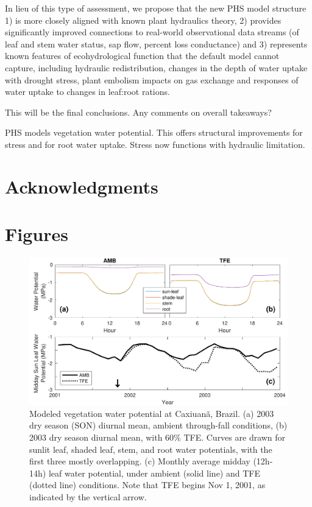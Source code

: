 \documentclass[draft,linenumbers]{agujournal}
\begin{document}
    In lieu of this type of assessment, we propose that the new PHS model structure 1) is more closely aligned with known plant hydraulics theory, 2) provides significantly improved connections to real-world observational data streams (of leaf and stem water status, sap flow, percent loss conductance) and 3) represents known features of ecohydrological function that the default model cannot capture, including hydraulic redistribution, changes in the depth of water uptake with drought stress, plant embolism impacts on gas exchange and responses of water uptake to changes in leaf:root rations. 
    
   
    This will be the final conclusions.
    Any comments on overall takeaways?

    PHS models vegetation water potential. 
    This offers structural improvements for stress and for root water uptake.
    Stress now functions with hydraulic limitation.
    
    

\section{Acknowledgments}

\clearpage    

\section{Figures}
  \begin{figure}[h]
     \centering
     \includegraphics[width=30pc]{../figs3/vwp.pdf}
     \caption{Modeled vegetation water potential at  Caxiuan\~a, Brazil.
     (a) 2003 dry season (SON) diurnal mean, ambient through-fall conditions,
     (b) 2003 dry season diurnal mean, with 60\% TFE.
     Curves are drawn for sunlit leaf, shaded leaf, stem, and root water potentials, with the first three mostly overlapping.
     (c) Monthly average midday (12h-14h) leaf water potential, under ambient (solid line) and TFE (dotted line) conditions.
     Note that TFE begins Nov 1, 2001, as indicated by the vertical arrow. 
     }
     \label{fig:vwp}
  \end{figure}
\end{document}
